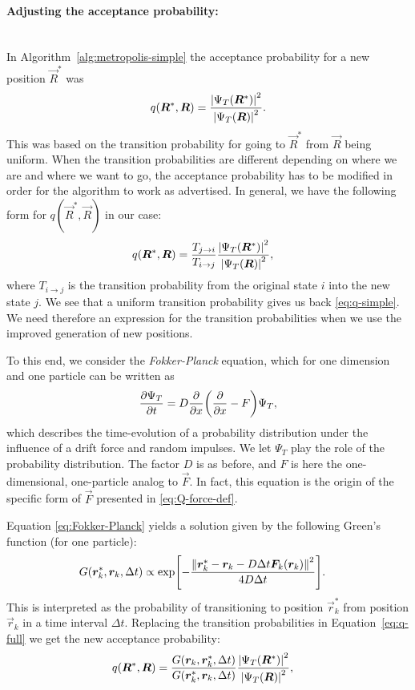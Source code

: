 \documentclass[twocolumn]{article}
\begin{document}
\paragraph{Adjusting the acceptance probability:}$\,$\\
In Algorithm~\ref{alg:metropolis-simple} the acceptance probability for a new
position $\vec R^*$ was
\begin{align}
    q(\bm R^*, \bm R) = \frac{\abs{\Psi_T(\bm R^*)}^2}{\abs{\Psi_T(\bm
    R)}^2}\label{eq:q-simple}.
\end{align}
This was based on the transition probability for going to $\vec R^*$ from $\vec
R$ being uniform. When the transition probabilities are different depending on 
where we are and where we want to go, the acceptance probability has to be
modified in order for the algorithm to work as advertised. In general, we have 
the following form for $q(\vec R^*, \vec R)$ in our case:
\begin{align}
    q(\bm R^*, \bm R) &= \frac{T_{j\rightarrow i}}{T_{i\rightarrow j}}\frac{\abs{\Psi_T(\bm R^*)}^2}{\abs{\Psi_T(\bm
    R)}^2},\label{eq:q-full}
\end{align}
where $T_{i\rightarrow j}$ is the transition probability from the original state
$i$ into the new state $j$. We see that a uniform transition probability gives
us back \eqref{eq:q-simple}. We need therefore an expression for the transition
probabilities when we use the improved generation of new positions.


To this end, we consider the \textit{Fokker-Planck} equation, which for one
dimension and one particle can be written as
\begin{align}
    \pdv{\Psi_T}{t} = D\pdv{}{x}\qty(\pdv{}{x} - F)\Psi_T,\label{eq:Fokker-Planck}
\end{align}
which describes the time-evolution of a probability distribution under the
influence of a drift force and random impulses. We let $\Psi_T$ play the role of the
probability distribution. The factor $D$ is as before, and $F$ is here the
one-dimensional, one-particle analog to $\vec F$. In
fact, this equation is the origin of the specific form of $\vec F$ presented in
\eqref{eq:Q-force-def}. 

Equation \eqref{eq:Fokker-Planck} yields a solution given by
the following Green's function (for one particle):
\begin{align}
    G(\bm r_k^*, \bm r_k, \Delta t) &\propto 
    \exp[- \frac{\norm{\bm r_k^* - \bm r_k - D\Delta t \bm F_k(\bm r_k)}^2}{4D\Delta t} ].
\end{align}
This is interpreted as the probability of transitioning to position $\vec r_k^*$
from position $\vec r_k$ in a time interval $\Delta t$. Replacing the transition
probabilities in Equation~\eqref{eq:q-full} we get the new acceptance
probability:
\begin{align}
    q(\bm R^*, \bm R) &= \frac{G(\bm r_k, \bm r_k^*, \Delta t)}{G(\bm r_k^*, \bm r_k, \Delta t)}\frac{\abs{\Psi_T(\bm R^*)}^2}{\abs{\Psi_T(\bm
    R)}^2},\label{eq:q-full-final}
\end{align}
\end{document}
